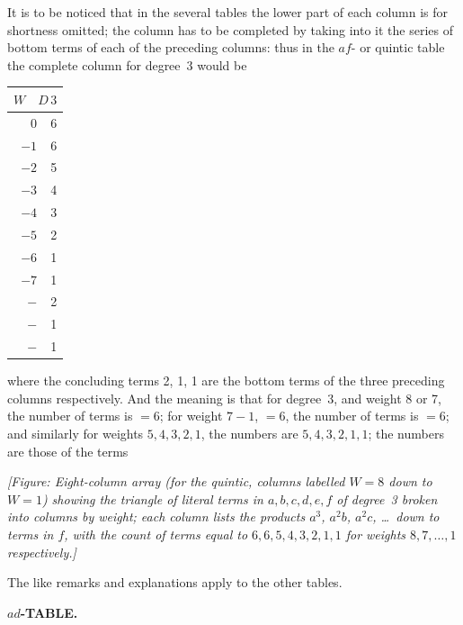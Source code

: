 \documentclass[11pt]{article}
\begin{document}
It is to be noticed that in the several tables the lower part of each column is for shortness omitted; the column has to be completed by taking into it the series of bottom terms of each of the preceding columns: thus in the $af$- or quintic table the complete column for degree~3 would be
\begin{center}
\begin{tabular}{rr}
\multicolumn{2}{c}{$W \quad D\,3$} \\
\hline
$\phantom{-}0$ & 6 \\
$-1$ & 6 \\
$-2$ & 5 \\
$-3$ & 4 \\
$-4$ & 3 \\
$-5$ & 2 \\
$-6$ & 1 \\
$-7$ & 1 \\
\hline
$-$ & 2 \\
$-$ & 1 \\
$-$ & 1
\end{tabular}
\end{center}
where the concluding terms 2, 1, 1 are the bottom terms of the three preceding columns respectively. And the meaning is that for degree~3, and weight 8 or 7, the number of terms is $=6$; for weight $7-1$, $=6$, the number of terms is $=6$; and similarly for weights $5, 4, 3, 2, 1$, the numbers are $5, 4, 3, 2, 1, 1$; the numbers are those of the terms

\medskip
\noindent\textit{[Figure: Eight-column array (for the quintic, columns labelled $W = 8$ down to $W = 1$) showing the triangle of literal terms in $a, b, c, d, e, f$ of degree~3 broken into columns by weight; each column lists the products $a^3$, $a^2 b$, $a^2 c$, \ldots\ down to terms in $f$, with the count of terms equal to $6, 6, 5, 4, 3, 2, 1, 1$ for weights $8, 7, \ldots, 1$ respectively.]}

The like remarks and explanations apply to the other tables.

\bigskip
\begin{center}\textbf{$ad$-TABLE.}\end{center}
\end{document}
